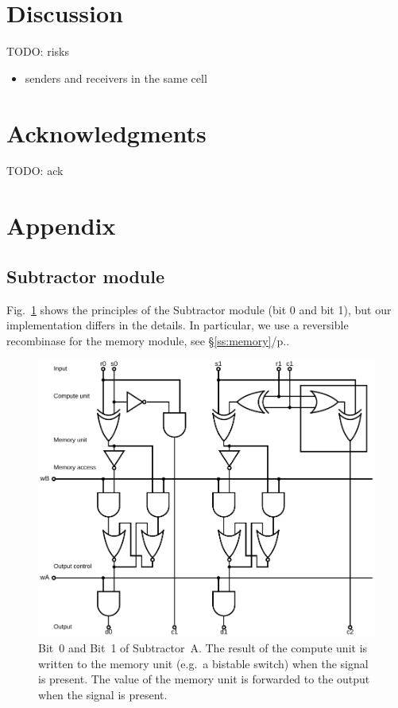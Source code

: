 \documentclass[12pt,notitlepage]{article}
\newcommand{\TODO}[1]{\textrm{\color{red}TODO: #1}}
\begin{document}
%

\section{Discussion}

\TODO{risks}
\begin{itemize}
\item 
    senders and receivers in the same cell
\end{itemize}


\section{Acknowledgments}

\TODO{ack}



\clearpage

\footnotesize


\normalsize

\clearpage


\section*{Appendix}

\subsection{Subtractor module}

Fig.~\ref{f:logical-subtractor01} 
shows the principles of
the Subtractor module (bit 0 and bit 1),
but our implementation
differs in the details.
%
In particular, we use a reversible recombinase
for the memory module, see \S\ref{ss:memory}/p.\pageref{ss:memory}.

\begin{figure}[phbt]
\centering
\includegraphics[width=0.9\linewidth]{circuits/Logical-HalfSubtractor0.svg.pdf}
%
\caption{%
Bit~0 and Bit~1
of
Subtractor~A.
%
The result of the compute unit is written to the memory unit
(e.g.~a bistable switch)
when the signal  is present.
%
The value of the memory unit is
forwarded to the output
when the signal  is present.
}
\label{f:logical-subtractor01}
\end{figure}
\end{document}
